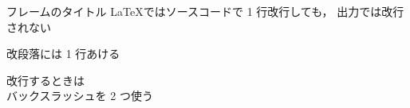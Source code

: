 \begin{frame}{フレームのタイトル}
  \LaTeX ではソースコードで 1 行改行しても，
  出力では改行されない

  改段落には 1 行あける

  改行するときは\\
  バックスラッシュを 2 つ使う
\end{frame}
